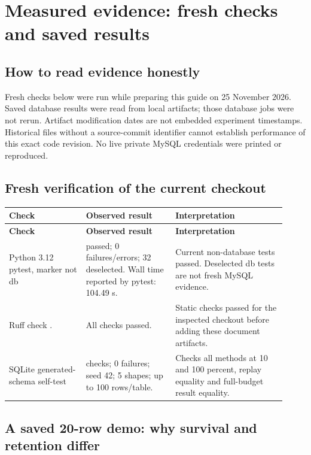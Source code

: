 \chapter{Measured evidence: fresh checks and saved results}

\section{How to read evidence honestly}

Fresh checks below were run while preparing this guide on 25 November 2026. Saved database results were read from local artifacts; those database jobs were not rerun. Artifact modification dates are not embedded experiment timestamps. Historical files without a source-commit identifier cannot establish performance of this exact code revision. No live private MySQL credentials were printed or reproduced.

\section{Fresh verification of the current checkout}

\begin{longtable}{>{\raggedright\arraybackslash}p{0.258\linewidth}>{\raggedright\arraybackslash}p{0.294\linewidth}>{\raggedright\arraybackslash}p{0.368\linewidth}}
\toprule
\textbf{Check} & \textbf{Observed result} & \textbf{Interpretation} \\
\midrule
\endfirsthead
\toprule
\textbf{Check} & \textbf{Observed result} & \textbf{Interpretation} \\
\midrule
\endhead
Python 3.12 pytest, marker not db & 368 passed; 0 failures/errors; 32 deselected. Wall time reported by pytest: 104.49 s. & Current non-database tests passed. Deselected db tests are not fresh MySQL evidence. \\[4pt]
Ruff check . & All checks passed. & Static checks passed for the inspected checkout before adding these document artifacts. \\[4pt]
SQLite generated-schema self-test & 30 checks; 0 failures; seed 42; 5 shapes; up to 100 rows/table. & Checks all methods at 10 and 100 percent, replay equality and full-budget result equality. \\[4pt]
\bottomrule
\end{longtable}


\section{A saved 20-row demo: why survival and retention differ}


